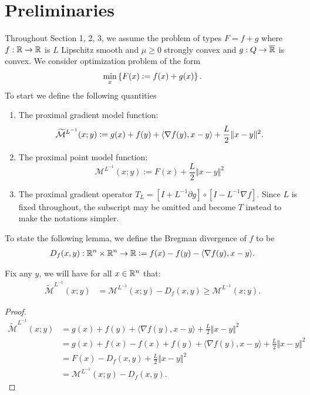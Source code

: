 \documentclass[12pt]{article}
\begin{document}
\section{Preliminaries}
    Throughout Section 1, 2, 3, we assume the problem of types $F = f + g$ where $f: \mathbb R \rightarrow \mathbb R$ is $L$ Lipschitz smooth and $\mu \ge 0$ strongly convex and $g: Q \rightarrow \overline {\mathbb R}$ is convex. 
    We consider optimization problem of the form
    \begin{align*}
        \min_x \left\lbrace
            F(x) \vcentcolon= f(x) + g(x)
        \right\rbrace. 
    \end{align*}
    To start we define the following quantities
    \begin{enumerate}
        \item The proximal gradient model function: 
        $$
            \widetilde{\mathcal M}^{L^{-1}}
            (x; y) \vcentcolon=
            g(x) + f(y) + \langle \nabla f(y), x - y\rangle 
            + \frac{L}{2}\Vert x - y\Vert^2. 
        $$
        \item The proximal point model function: 
        $$
            \mathcal M^{L^{-1}}(x; y) := F(x) + \frac{L}{2}\Vert x - y\Vert^2
        $$
        \item The proximal gradient operator $T_L = [I + L^{-1}\partial g]\circ [I - L^{-1}\nabla f]$. Since $L$ is fixed throughout, the subscript may be omitted and become $T$ instead to make the notations simpler. 
    \end{enumerate}
    To state the following lemma, we define the Bregman divergence of $f$ to be 
    \begin{align*}
        D_f(x, y): \mathbb R^n \times \mathbb R^n \rightarrow \mathbb R 
        \vcentcolon= f(x) - f(y) - \langle \nabla f(y), x - y\rangle. 
    \end{align*}
    
    \begin{lemma} 
        Fix any $y$, we will have for all $x \in \mathbb R^n$ that: 
        \begin{align*}
            \widetilde{\mathcal M}^{L^{-1}}(x; y)
            &= 
            \mathcal M^{L^{-1}}(x; y)- D_f(x, y) \ge \mathcal M^{L^{-1}}(x; y). 
        \end{align*}
    \end{lemma}
    \begin{proof}
        \begin{align*}
            \widetilde{\mathcal M}^{L^{-1}}(x; y) 
            &= 
            g(x) + f(y) + \langle \nabla f(y), x - y\rangle + \frac{L}{2}\Vert x - y\Vert^2
            \\
            &= 
            g(x) + f(x) - f(x) + f(y) 
            + \langle \nabla f(y), x - y\rangle + \frac{L}{2}\Vert x - y\Vert^2
            \\
            &= 
            F(x) - D_f(x, y) + \frac{L}{2}\Vert x - y\Vert^2 
            \\
            &= \mathcal M^{L^{-1}}(x; y) - D_f(x, y). 
        \end{align*}
    \end{proof}
    
\end{document}
